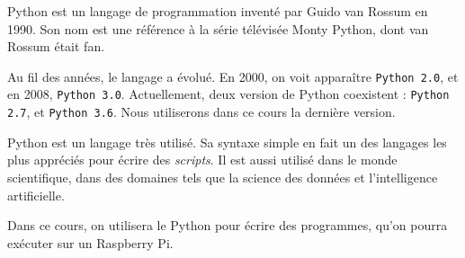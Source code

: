 Python est un langage de programmation inventé par Guido van Rossum en 1990. Son nom est une référence à la série télévisée Monty Python, dont van Rossum était fan.

Au fil des années, le langage a évolué. En 2000, on voit apparaître \texttt{Python 2.0}, et en 2008, \texttt{Python 3.0}.
Actuellement, deux version de Python coexistent : \texttt{Python 2.7}, et \texttt{Python 3.6}. Nous utiliserons dans ce cours la dernière version.

Python est un langage très utilisé. Sa syntaxe simple en fait un des langages les plus appréciés pour écrire des \textit{scripts}. Il est aussi utilisé dans le monde scientifique, dans des domaines tels que la science des données et l'intelligence artificielle.

Dans ce cours, on utilisera le Python pour écrire des programmes, qu'on pourra exécuter sur un Raspberry Pi.